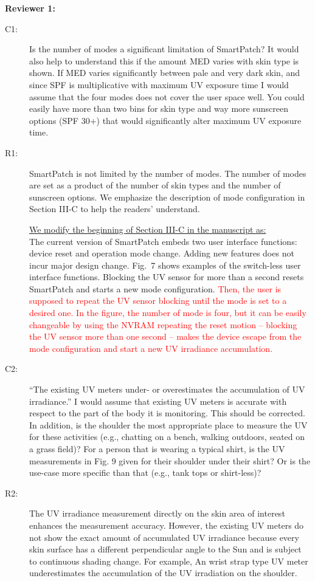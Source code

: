 \documentclass[onecolumn]{IEEEconf}
\begin{document}
\setlength{\parindent}{0cm}
\textbf{Reviewer 1:}
\begin{description}
\item [C1: ] Is the number of modes a significant limitation of SmartPatch? It would also help to understand this if the amount MED varies with skin type is shown. If MED varies significantly between pale and very dark skin, and since SPF is multiplicative with maximum UV exposure time I would assume that the four modes does not cover the user space well. You could easily have more than two bins for skin type and way more sunscreen options (SPF 30+) that would significantly alter maximum UV exposure time.  
\item [R1: ] SmartPatch is not limited by the number of modes. The number of modes are set as a product of the number of skin types and the number of sunscreen options. We emphasize the description of mode configuration in Section III-C to help the readers’ understand.

\underline{We modify the beginning of Section III-C in the manuscript as:}\\
The current version of SmartPatch embeds two user interface functions: device reset and operation mode change.
Adding new features does not incur major design change.
Fig.~7 shows examples of the switch-less user interface functions.
Blocking the UV sensor for more than a second resets SmartPatch and starts a new mode configuration.
\textcolor{red}{Then, the user is supposed to repeat the UV sensor blocking until the mode is set to a desired one. In the figure, the number of mode is four, but it can be easily changeable by using the NVRAM
repeating the reset motion -- blocking the UV sensor more than one second -- makes the device escape from the mode configuration and start a new UV irradiance accumulation.}~\\

\item [C2: ] “The existing UV meters under- or overestimates the accumulation of UV irradiance.” I would assume that existing UV meters is accurate with respect to the part of the body it is monitoring. This should be corrected. In addition, is the shoulder the most appropriate place to measure the UV for these activities (e.g., chatting on a bench, walking outdoors, seated on a grass field)? For a person that is wearing a typical shirt, is the UV measurements in Fig. 9 given for their shoulder under their shirt? Or is the use-case more specific than that (e.g., tank tops or shirt-less)?
\item [R2: ] The UV irradiance measurement directly on the skin area of interest enhances the measurement accuracy. However, the existing UV meters do not show the exact amount of accumulated UV irradiance because every skin surface has a different perpendicular angle to the Sun and is subject to continuous shading change. For example, An wrist strap type UV meter underestimates the accumulation of the UV irradiation on the shoulder. 
~\\


\end{description}
\end{document}
